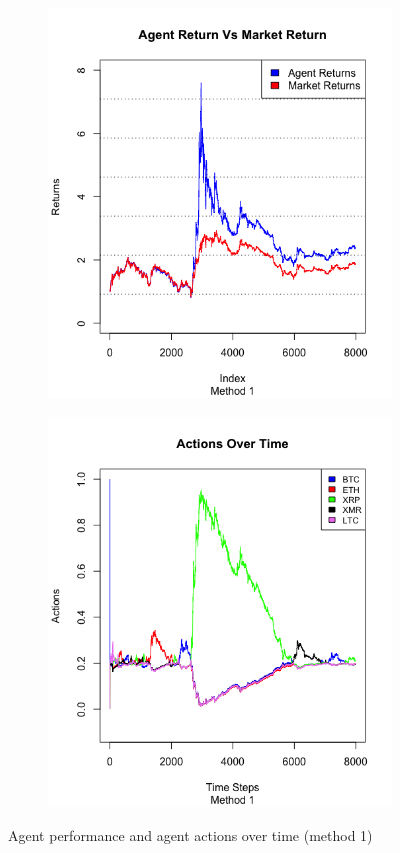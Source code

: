 \documentclass[a4paper,12pt]{article}
\begin{document}
\begin{figure}[h!]
  \centering
  \begin{subfigure}[b]{0.4\linewidth}
    \includegraphics[width=\linewidth]{figures/agt_vs_mkt1.png}
  \end{subfigure}
  \begin{subfigure}[b]{0.4\linewidth}
    \includegraphics[width=\linewidth]{figures/actions1.png}
  \end{subfigure}
  \caption{Agent performance and agent actions over time (method 1)}
  \label{fig:method1}
\end{figure}
\end{document}
